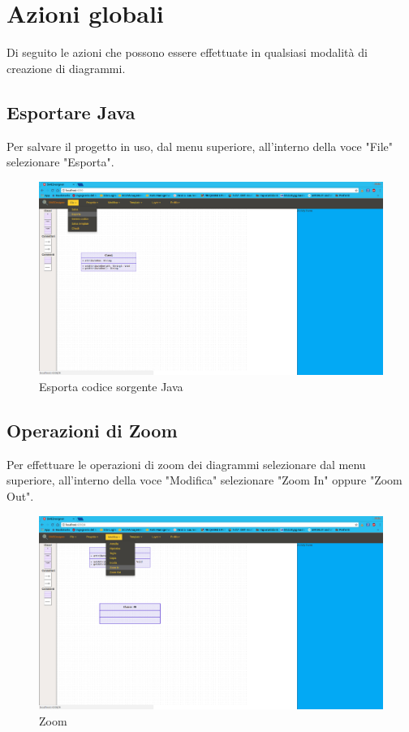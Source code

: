 \section{Azioni globali}
Di seguito le azioni che possono essere effettuate in qualsiasi modalità di creazione di diagrammi.

\subsection{Esportare Java}
Per salvare il progetto in uso, dal menu superiore, all'interno della voce "File" selezionare "Esporta".
\begin{figure}[h!]
	\centering
		\includegraphics[scale=0.22]{res/img/esporta.png}
	\caption{Esporta codice sorgente Java}
\end{figure}

\newpage

\subsection{Operazioni di Zoom}
Per effettuare le operazioni di zoom dei diagrammi selezionare dal menu superiore, all'interno della voce "Modifica" selezionare "Zoom In" oppure "Zoom Out".
\begin{figure}[h!]
	\centering
		\includegraphics[scale=0.22]{res/img/Zoom.png}
	\caption{Zoom}
\end{figure}
\newpage

